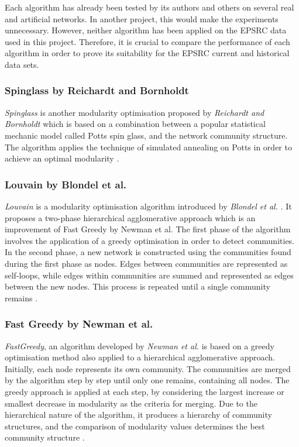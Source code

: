 Each algorithm has already been tested by its authors and others on several real and artificial networks. In another project, this would make the experiments unnecessary. However, neither algorithm has been applied on the EPSRC data used in this project. Therefore, it is crucial to compare the performance of each algorithm in order to prove its suitability for the EPSRC current and historical data sets.

\subsubsection{Spinglass by Reichardt and Bornholdt}

\textit{Spinglass} is another modularity optimisation proposed by \textit{Reichardt and Bornholdt} \cite{reichardt2006statistical} which is based on a combination between a popular statistical mechanic model called Potts spin glass, and the network community structure. The algorithm applies the technique of simulated annealing on Potts in order to achieve an optimal modularity \cite{orman2011accuracy}.

\subsubsection{Louvain by Blondel et al.}

\textit{Louvain} is a modularity optimisation algorithm introduced by \textit{Blondel et al.} \cite{blondel2008fast}. It proposes a two-phase hierarchical agglomerative approach which is an improvement of Fast Greedy by Newman et al. \cite{newman2004fast} The first phase of the algorithm involves the application of a greedy optimisation in order to detect communities. In the second phase, a new network is constructed using the communities found during the first phase as nodes. Edges between communities are represented as self-loops, while edges within communities are summed and represented as edges between the new nodes. This process is repeated until a single community remains \cite{orman2011accuracy}.

\subsubsection{Fast Greedy by Newman et al.}

\textit{FastGreedy}, an algorithm developed by \textit{Newman et al.} \cite{newman2004fast} is based on a greedy optimisation method also applied to a hierarchical agglomerative approach. Initially, each node represents its own community. The communities are merged by the algorithm step by step until only one remains, containing all nodes. The greedy approach is applied at each step, by considering the largest increase or smallest decrease in modularity as the criteria for merging. Due to the hierarchical nature of the algorithm, it produces a hierarchy of community structures, and the comparison of modularity values determines the best community structure \cite{orman2011accuracy}.